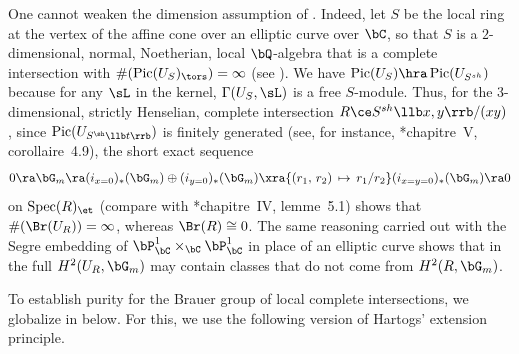 \brem
One cannot weaken the dimension assumption of . Indeed, let $S$ be the local ring at the vertex of the affine cone over an elliptic curve over $\bC$, so that $S$ is a $2$-dimensional, normal, Noetherian, local $\bQ$-algebra that is a complete intersection with $\#(\Pic(U_S)_\tors) = \infty$ (see ). We have  $\Pic(U_S) \hra \Pic(U_{S^{sh}})$ because for any $\sL$ in the kernel, $\Gamma(U_S, \sL)$ is a free $S$-module. Thus, for the $3$-dimensional, strictly Henselian, complete intersection $R \ce S^{sh}\llb x, y\rrb/(xy)$, since $\Pic(U_{S^\sh\llb t \rrb})$ is finitely generated (see, for instance, \cite{Bou78}*{chapitre~V, corollaire~4.9}), the short exact sequence
\[%
\source{purity-flat-cohomology}
0 \ra \bG_m \ra (i_{x = 0})_*(\bG_m) \oplus (i_{y = 0})_*(\bG_m) \xra{(r_1,\, r_2)\, \mapsto\, r_1/r_2} (i_{x = y = 0})_*(\bG_m) \ra 0
\]
on $\Spec(R)_\et$ (compare with \cite{Bou78}*{chapitre~IV, lemme~5.1}) shows that $\#(\Br(U_R)) = \infty$, whereas  $\Br(R) \cong 0$. The same reasoning carried out with the Segre embedding of $\bP^1_\bC \times_\bC \bP^1_\bC$ in place of an elliptic curve shows that in  the full $H^2(U_R, \bG_m)$ may contain classes that do not come from $H^2(R, \bG_m)$.
\erem











To establish purity for the Brauer group of local complete intersections, we globalize  in  below. For this, we use the following version of Hartogs' extension principle.






